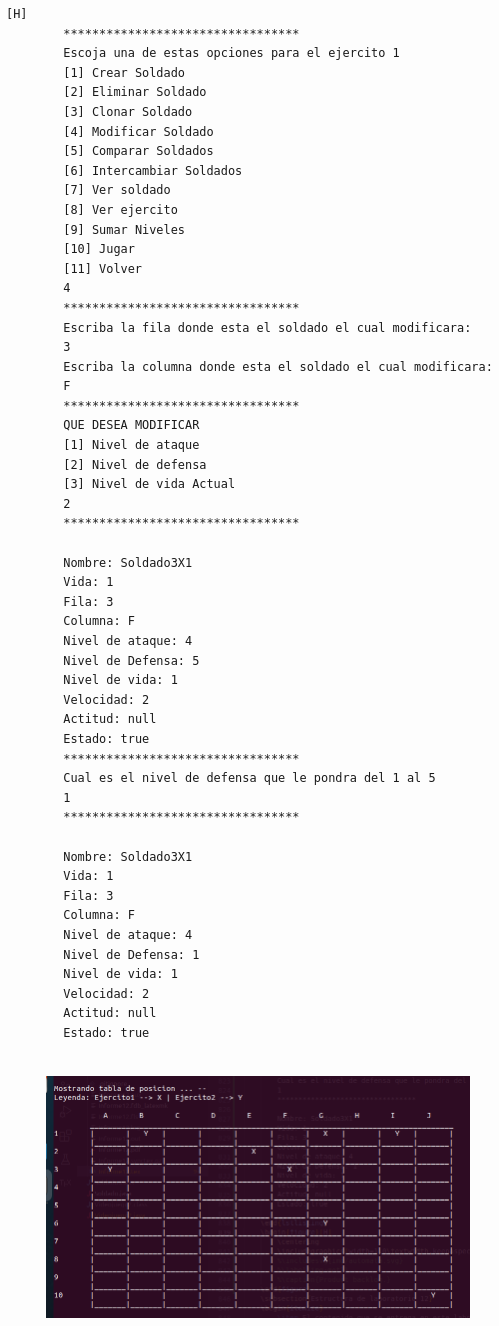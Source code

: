 \documentclass{article}
\begin{document}
	\begin{lstlisting}[language=bash,caption={Ejecucion:}][H]
		*********************************
		Escoja una de estas opciones para el ejercito 1
		[1] Crear Soldado
		[2] Eliminar Soldado
		[3] Clonar Soldado
		[4] Modificar Soldado
		[5] Comparar Soldados
		[6] Intercambiar Soldados
		[7] Ver soldado
		[8] Ver ejercito
		[9] Sumar Niveles
		[10] Jugar
		[11] Volver
		4
		*********************************
		Escriba la fila donde esta el soldado el cual modificara:
		3
		Escriba la columna donde esta el soldado el cual modificara:
		F
		*********************************
		QUE DESEA MODIFICAR
		[1] Nivel de ataque
		[2] Nivel de defensa
		[3] Nivel de vida Actual
		2
		*********************************
		
		Nombre: Soldado3X1
		Vida: 1
		Fila: 3
		Columna: F
		Nivel de ataque: 4
		Nivel de Defensa: 5
		Nivel de vida: 1
		Velocidad: 2
		Actitud: null
		Estado: true
		*********************************
		Cual es el nivel de defensa que le pondra del 1 al 5 
		1
		*********************************
		
		Nombre: Soldado3X1
		Vida: 1
		Fila: 3
		Columna: F
		Nivel de ataque: 4
		Nivel de Defensa: 1
		Nivel de vida: 1
		Velocidad: 2
		Actitud: null
		Estado: true		
		
	\end{lstlisting}
	\begin{figure}[H]
		\centering
		\includegraphics[width=1.0\textwidth,keepaspectratio]{img/Commit7.1.png}
	\end{figure}
\end{document}
